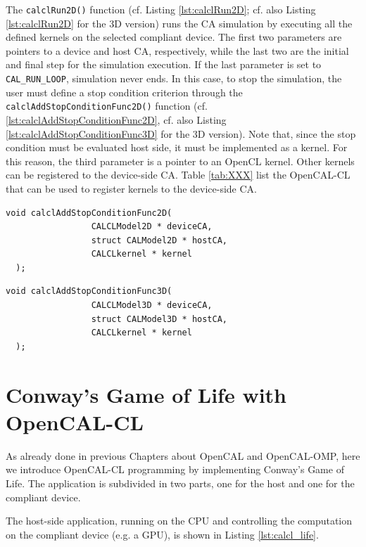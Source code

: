 The \verb'calclRun2D()' function (cf. Listing \ref{lst:calclRun2D};
cf. also Listing \ref{lst:calclRun2D} for the 3D version) runs the CA
simulation by executing all the defined kernels on the selected
compliant device. The first two parameters are pointers to a device
and host CA, respectively, while the last two are the initial and
final step for the simulation execution. If the last parameter is set
to \verb'CAL_RUN_LOOP', simulation never ends. In this case, to stop
the simulation, the user must define a stop condition criterion
through the \verb'calclAddStopConditionFunc2D()' function
(cf. \ref{lst:calclAddStopConditionFunc2D}, cf. also Listing
\ref{lst:calclAddStopConditionFunc3D} for the 3D version). Note that,
since the stop condition must be evaluated host side, it must be
implemented as a kernel. For this reason, the third parameter is a
pointer to an OpenCL kernel. Other kernels can be registered to the
device-side CA. Table \ref{tab:XXX} list the OpenCAL-CL that can be
used to register kernels to the device-side CA.


\begin{lstlisting}[float,floatplacement=H, label=lst:calclAddStopConditionFunc2D, caption=The calclAddStopConditionFunc2D function., numbers=none]
  void calclAddStopConditionFunc2D(
                 CALCLModel2D * deviceCA,
                 struct CALModel2D * hostCA,
                 CALCLkernel * kernel
  );
\end{lstlisting}

\begin{lstlisting}[float,floatplacement=H, label=lst:calclAddStopConditionFunc3D, caption=The calclAddStopConditionFunc3D function., numbers=none]
  void calclAddStopConditionFunc3D(
                 CALCLModel3D * deviceCA,
                 struct CALModel3D * hostCA,
                 CALCLkernel * kernel
  );
\end{lstlisting}


\section{Conway's Game of Life with OpenCAL-CL}\label{sec:calcl_life}

As already done in previous Chapters about OpenCAL and OpenCAL-OMP,
here we introduce OpenCAL-CL programming by implementing Conway's Game
of Life. The application is subdivided in two parts, one for the host
and one for the compliant device.

The host-side application, running on the CPU and controlling the
computation on the compliant device (e.g. a GPU), is shown in Listing
\ref{lst:calcl_life}.


